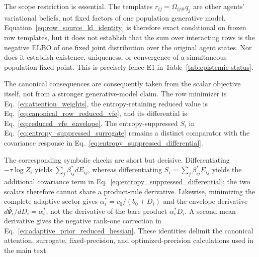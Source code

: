 \documentclass[12pt]{article}
\begin{document}
The scope restriction is essential. The templates $r_{ij}=\Omega_{ij\#}q_j$ are other agents' variational beliefs, not fixed factors of one population generative model. Equation~\eqref{eq:row_source_kl_identity} is therefore exact conditional on frozen row templates, but it does not establish that the sum over interacting rows is the negative ELBO of one fixed joint distribution over the original agent states. Nor does it establish existence, uniqueness, or convergence of a simultaneous population fixed point. This is precisely fence E1 in Table~\ref{tab:epistemic-status}.

The canonical consequences are consequently taken from the scalar objective itself, not from a stronger generative-model claim. The row minimizer is Eq.~\eqref{eq:attention_weights}, the entropy-retaining reduced value is Eq.~\eqref{eq:canonical_row_reduced_vfe}, and its differential is Eq.~\eqref{eq:reduced_vfe_envelope}. The entropy-suppressed $S_i$ in Eq.~\eqref{eq:entropy_suppressed_surrogate} remains a distinct comparator with the covariance response in Eq.~\eqref{eq:entropy_suppressed_differential}.

The corresponding symbolic checks are short but decisive. Differentiating $-\tau\log Z_i$ yields $\sum_j\beta_{ij}^*dE_{ij}$, whereas differentiating $S_i=\sum_j\beta_{ij}^*E_{ij}$ yields the additional covariance term in Eq.~\eqref{eq:entropy_suppressed_differential}; the two scalars therefore cannot share a product-rule derivative. Likewise, minimizing the complete adaptive sector gives $\alpha_i^*=c_0/(b_0+D_i)$ and the envelope derivative $d\bar\Psi_i/dD_i=\alpha_i^*$, not the derivative of the bare product $\alpha_i^*D_i$. A second mean derivative gives the negative rank-one correction in Eq.~\eqref{eq:adaptive_prior_reduced_hessian}. These identities delimit the canonical attention, surrogate, fixed-precision, and optimized-precision calculations used in the main text.



\end{document}
